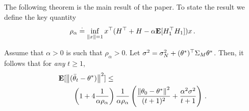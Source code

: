 The following theorem is the main result of the paper.
To state the result we define the key quantity
\begin{align}
\label{eq:rhodef}
\rho_\alpha\stackrel{\cdot}{=} \inf_{\left\| x\right\|=1} x^\top (H^\top+H-\alpha\mathbf{E}[ H_1^\top H_1] )x\,.
\end{align}
\begin{theorem}\label{maintheorem}
Assume that $\alpha>0$ is such that $\rho_\alpha>0$. Let $\sigma^2 = \sigma_N^2 + (\theta^*)^\top \Sigma_M \theta^*$.
Then, it follows that for \emph{any} $t\ge 1$,
\begin{align}
\begin{split}
\MoveEqLeft\E[\norm{(\tb_t-\ts)}^2]\leq \\
&\left(1+4\frac1{\alpha\rho_{\alpha}}\right) \frac{1}{\alpha\rho_{\alpha}}
 \left(\frac{\norm{\theta_0-\ts}^2}{(t+1)^2}+\frac{\alpha^2\sigma^2}{t+1} \right)\,.
\end{split}
\end{align}
\end{theorem}

